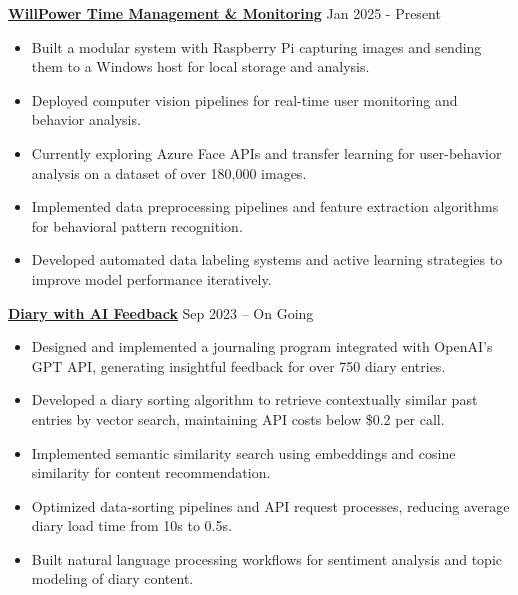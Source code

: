 \documentclass[letterpaper,10pt]{article}
\begin{document}
\vspace{0.2cm}
\noindent\href{https://github.com/Ken-2511/WillPower}{\uline{
\textbf{WillPower \textbar{} Time Management \& Monitoring}}} \hfill Jan 2025 - Present
\begin{itemize}[leftmargin=0.2in]
    \item Built a modular system with Raspberry Pi capturing images and sending them to a Windows host for local storage and analysis.
    \item Deployed computer vision pipelines for real-time user monitoring and behavior analysis.
    \item Currently exploring Azure Face APIs and transfer learning for user-behavior analysis on a dataset of over 180,000 images.
    \item Implemented data preprocessing pipelines and feature extraction algorithms for behavioral pattern recognition.
    \item Developed automated data labeling systems and active learning strategies to improve model performance iteratively.
\end{itemize}

\vspace{0.2cm}
\noindent\href{https://github.com/Ken-2511/Diary-with-ChatGPT-Comment}{\uline{
\textbf{Diary with AI Feedback}}} \hfill Sep 2023 -- On Going
\begin{itemize}[leftmargin=0.2in]
    \item Designed and implemented a journaling program integrated with OpenAI's GPT API, generating insightful feedback for over 750 diary entries.
    \item Developed a diary sorting algorithm to retrieve contextually similar past entries by vector search, maintaining API costs below \$0.2 per call.
    \item Implemented semantic similarity search using embeddings and cosine similarity for content recommendation.
    \item Optimized data-sorting pipelines and API request processes, reducing average diary load time from 10s to 0.5s.
    \item Built natural language processing workflows for sentiment analysis and topic modeling of diary content.
\end{itemize}
\end{document}
